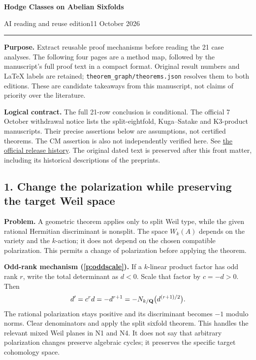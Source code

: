 \thispagestyle{plain}
{\fontsize{22}{26}\selectfont\sffamily\bfseries Hodge Classes on Abelian Sixfolds\par}
\vspace{5pt}
{\large\sffamily AI reading and reuse edition}\hfill 11 October 2026\par
\medskip\hrule\medskip
\noindent\textbf{Purpose.} Extract reusable proof mechanisms before reading the 21 case analyses. The following four pages are a method map, followed by the manuscript's full proof text in a compact format. Original result numbers and LaTeX labels are retained; \texttt{theorem\_graph/theorems.json} resolves them to both editions. These are candidate takeaways from this manuscript, not claims of priority over the literature.

\medskip\noindent\colorbox{ScopeBackground}{\parbox{\dimexpr\linewidth-2\fboxsep\relax}{\textbf{Logical contract.} The full 21-row conclusion is conditional. The official 7 October withdrawal notice lists the split-eightfold, Kuga--Satake and K3-product manuscripts. Their precise assertions below are assumptions, not certified theorems. The CM assertion is also not independently verified here. See \href{https://github.com/openai/math/blob/main/history.md}{the official release history}. The original dated text is preserved after this front matter, including its historical descriptions of the preprints.}}

\subsection*{1. Change the polarization while preserving the target Weil space}
\textbf{Problem.} A geometric theorem applies only to split Weil type, while the given rational Hermitian discriminant is nonsplit. The space $W_k(A)$ depends on the variety and the $k$-action; it does not depend on the chosen compatible polarization. This permits a change of polarization before applying the theorem.

\textbf{Odd-rank mechanism (\ref{p:oddscale}).} If a $k$-linear product factor has odd rank $r$, write the total determinant as $d<0$. Scale that factor by $c=-d>0$. Then
\[
 d'=c^r d=-d^{r+1}=-N_{k/\mathbf Q}\bigl(d^{(r+1)/2}\bigr).
\]
The rational polarization stays positive and its discriminant becomes $-1$ modulo norms. Clear denominators and apply the split sixfold theorem. This handles the relevant mixed Weil planes in N1 and N4. It does not say that arbitrary polarization changes preserve algebraic cycles; it preserves the specific target cohomology space.

